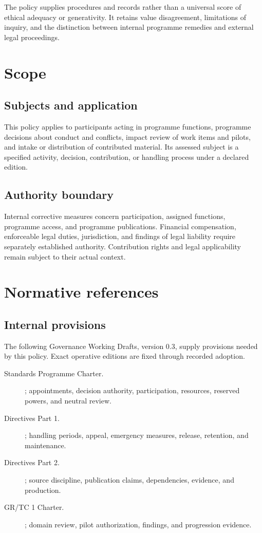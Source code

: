 \documentclass[11pt,a4paper]{article}
\begin{document}
The policy supplies procedures and records rather than a universal score of ethical adequacy or generativity. It retains value disagreement, limitations of inquiry, and the distinction between internal programme remedies and external legal proceedings.

\GSPmainmatter
\section{Scope}
\subsection{Subjects and application}
This policy applies to participants acting in programme functions, programme decisions about conduct and conflicts, impact review of work items and pilots, and intake or distribution of contributed material. Its assessed subject is a specified activity, decision, contribution, or handling process under a declared edition.


\subsection{Authority boundary}
Internal corrective measures concern participation, assigned functions, programme access, and programme publications. Financial compensation, enforceable legal duties, jurisdiction, and findings of legal liability require separately established authority. Contribution rights and legal applicability remain subject to their actual context.

\section{Normative references}
\subsection{Internal provisions}
The following Governance Working Drafts, version 0.3, supply provisions needed by this policy. Exact operative editions are fixed through recorded adoption.

\begin{description}
\item[Standards Programme Charter.] ; appointments, decision authority, participation, resources, reserved powers, and neutral review.
\item[Directives Part 1.] ; handling periods, appeal, emergency measures, release, retention, and maintenance.
\item[Directives Part 2.] ; source discipline, publication claims, dependencies, evidence, and production.
\item[GR/TC 1 Charter.] ; domain review, pilot authorization, findings, and progression evidence.
\end{description}
\end{document}
